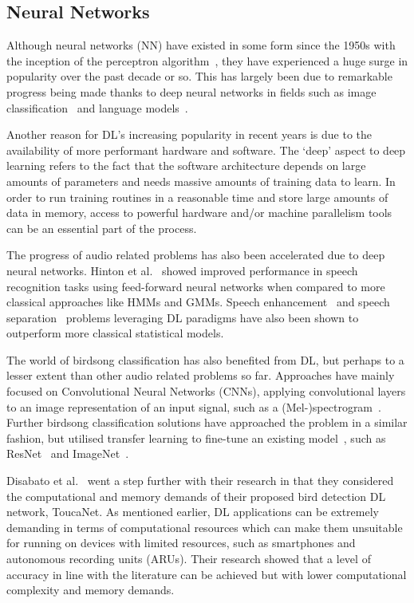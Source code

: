 \subsection{Neural Networks}\label{ssec:nn}

Although neural networks (NN) have existed in some form since the 1950s with the
inception of the perceptron algorithm~\cite{rosenblatt1958perceptron}, they have
experienced a huge surge in popularity over the past decade or so. This has
largely been due to remarkable progress being made thanks to deep neural
networks in fields such as image classification~\cite{krizhevsky2012imagenet}
and language models~\cite{mikolov2010recurrent}.

Another reason for DL's increasing popularity in recent years is due to the
availability of more performant hardware and software. The `deep' aspect to deep
learning refers to the fact that the software architecture depends on large
amounts of parameters and needs massive amounts of training data to learn. In
order to run training routines in a reasonable time and store large amounts of
data in memory, access to powerful hardware and/or machine parallelism tools can
be an essential part of the process.

The progress of audio related problems has also been accelerated due to deep
neural networks. Hinton et al.~\cite{hinton2012deep} showed improved performance
in speech recognition tasks using feed-forward neural networks when compared to
more classical approaches like HMMs and GMMs. Speech
enhancement~\cite{afouras2018conversation} and speech
separation~\cite{ephrat2018looking} problems leveraging DL paradigms
have also been shown to outperform more classical statistical models.

The world of birdsong classification has also benefited from DL, but perhaps to
a lesser extent than other audio related problems so far. Approaches have mainly
focused on Convolutional Neural Networks (CNNs), applying convolutional layers
to an image representation of an input signal, such as a
(Mel-)spectrogram~\cite{berger2018bird,mukherjee2018convolutional}. Further
birdsong classification solutions have approached the problem in a similar
fashion, but utilised transfer learning to fine-tune an existing
model~\cite{disabato2021birdsong,lasseck2018acoustic}, such as
ResNet~\cite{he2016deep} and ImageNet~\cite{deng2009imagenet}.

Disabato et al.~\cite{disabato2021birdsong} went a step further with their
research in that they considered the computational and memory demands of their
proposed bird detection DL network, ToucaNet. As mentioned earlier, DL
applications can be extremely demanding in terms of computational resources
which can make them unsuitable for running on devices with limited resources,
such as smartphones and autonomous recording units (ARUs). Their research showed
that a level of accuracy in line with the literature can be achieved but with
lower computational complexity and memory demands.

